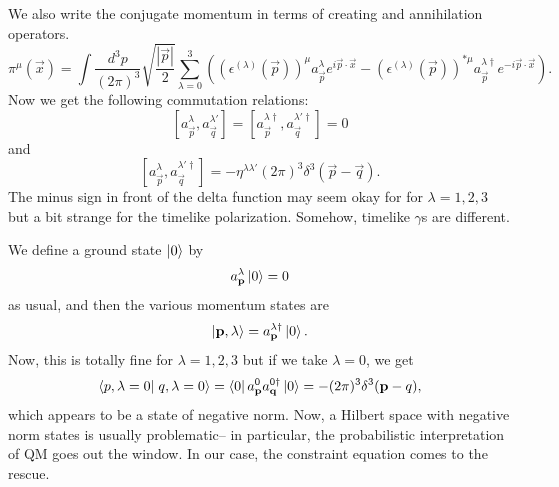 We also write the conjugate momentum in terms of creating and annihilation operators.
$$\pi^\mu(\vec x) =\int \frac{d^3p}{(2\pi)^3} \sqrt{\frac{|\vec p|}{2}} \sum_{\lambda=0}^3 \left((\epsilon^{(\lambda)}(\vec p))^{\mu} a_{\vec p}^\lambda e^{i \vec p \cdot \vec x}-(\epsilon^{(\lambda)} (\vec p))^{*\mu} a_{\vec p}^{\lambda \dagger} e^{-i\vec p \cdot \vec x}\right).$$
Now we get the following commutation relations:
$$[a_{\vec p}^\lambda,a_{\vec q}^{\lambda'}]=[a_{\vec p}^{\lambda \dagger},a_{\vec q}^{\lambda' \dagger}]=0$$
and
$$[a_{\vec p}^\lambda, a_{\vec q}^{\lambda' \dagger}]=-\eta^{\lambda \lambda'} (2\pi)^3 \delta^3(\vec p-\vec q).$$
The minus sign in front of the delta function may seem okay for for $\lambda=1,2,3$ but a bit strange for the timelike polarization. Somehow, timelike $\gamma$s are different.

We define a ground state $\left| 0 \right>$ by
$$a_{\boldsymbol{\mathbf{p}}}^\lambda \left| 0 \right>=0$$ as usual, and then the various momentum states are
$$\left| \boldsymbol{\mathbf{p}},\lambda \right>=a_{\boldsymbol{\mathbf{p}}}^{\lambda \dagger}\left| 0 \right>.$$
Now, this is totally fine for $\lambda=1,2,3$ but if we take $\lambda=0$, we get
$$\braket{p,\lambda=0}{q,\lambda=0}=\bra{0}a_{\vec p}^0 a_{\vec q}^{0\dagger} \ket{0}=-(2\pi)^3 \delta^3(\vec p-q),$$
which appears to be a state of negative norm. Now, a Hilbert space with negative norm states is usually problematic-- in particular, the probabilistic interpretation of QM goes out the window. In our case, the constraint equation comes to the rescue.

